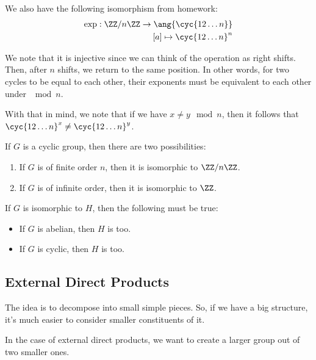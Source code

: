 \documentclass[openany]{book}
\begin{document}
\begin{example}
	We also have the following isomorphism from homework:
	\begin{align*}
		\mathrm{exp} : \ZZ/n\ZZ \rightarrow \ang{\cyc{1 2 \ldots n}} \\
		[a] \mapsto \cyc{1 2 \ldots n}^{n}
	\end{align*}

	We note that it is injective since we can think of the operation as right shifts. Then, after $n$ shifts, we return to the same position. In other words, for two cycles to be equal to each other, their exponents must be equivalent to each other under $\mod n$.
	
	With that in mind, we note that if we have $x \neq y \mod n$, then it follows that $\cyc{1 2 \ldots n}^{x} \neq \cyc{1 2 \ldots n}^{y}$.
\end{example}

\begin{thm}
	If $G$ is a cyclic group, then there are two possibilities:
	\begin{enumerate}
		\item If $G$ is of finite order $n$, then it is isomorphic to $\ZZ/n\ZZ$.
		\item If $G$ is of infinite order, then it is isomorphic to $\ZZ$.
	\end{enumerate}
\end{thm}

\begin{thm}
	If $G$ is isomorphic to $H$, then the following must be true:
	\begin{itemize}
		\item If $G$ is abelian, then $H$ is too.
		\item If $G$ is cyclic, then $H$ is too.
	\end{itemize}
\end{thm}

\subsection{External Direct Products}
The idea is to decompose into small simple pieces. So, if we have a big structure, it's much easier to consider smaller constituents of it.

In the case of external direct products, we want to create a larger group out of two smaller ones.
\end{document}
